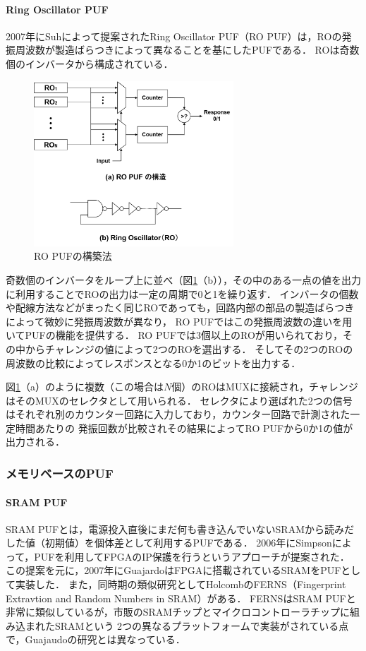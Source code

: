 \documentclass[technicalreport]{ieicej} %
\begin{document}
\paragraph{Ring Oscillator PUF}
\label{ROPUF}
2007年にSuhによって提案されたRing Oscillator PUF（RO PUF）\cite{suh}は，ROの発振周波数が製造ばらつきによって異なることを基にしたPUFである．
ROは奇数個のインバータから構成されている．
\begin{figure}[tb]
  \begin{center}
    \includegraphics[width=75mm]{ROpuf.png}
  \end{center}
  \caption{RO PUFの構築法}
  \label{ROPUF-fig}
\end{figure}
奇数個のインバータをループ上に並べ（図\ref{ROPUF-fig}（b）），その中のある一点の値を出力に利用することでROの出力は一定の周期で0と1を繰り返す．
インバータの個数や配線方法などがまったく同じROであっても，回路内部の部品の製造ばらつきによって微妙に発振周波数が異なり，
RO PUFではこの発振周波数の違いを用いてPUFの機能を提供する．
RO PUFでは3個以上のROが用いられており，その中からチャレンジの値によって2つのROを選出する．
そしてその2つのROの周波数の比較によってレスポンスとなる0か1のビットを出力する．

図\ref{ROPUF-fig}（a）のように複数（この場合は$N$個）のROはMUXに接続され，チャレンジはそのMUXのセレクタとして用いられる．
セレクタにより選ばれた2つの信号はそれぞれ別のカウンター回路に入力しており，カウンター回路で計測された一定時間あたりの
発振回数が比較されその結果によってRO PUFから0か1の値が出力される．
\subsubsection{メモリベースのPUF}
\label{memorypuf}
\paragraph{SRAM PUF}
\label{SRAM PUF}
SRAM PUFとは，電源投入直後にまだ何も書き込んでいないSRAMから読みだした値（初期値）を個体差として利用するPUFである\cite{sugatake}．
2006年にSimpsonによって，PUFを利用してFPGAのIP保護を行うというアプローチ\cite{simpson}が提案された．
この提案を元に，2007年にGuajardoはFPGAに搭載されているSRAMをPUFとして実装\cite{guajaudo}した．
また，同時期の類似研究としてHolcombのFERNS（Fingerprint Extravtion and Random Numbers in SRAM）\cite{holcomb}がある．
FERNSはSRAM PUFと非常に類似しているが，市販のSRAMチップとマイクロコントローラチップに組み込まれたSRAMという
2つの異なるプラットフォームで実装がされている点で，Guajaudoの研究とは異なっている\cite{maes1}．
\end{document}
